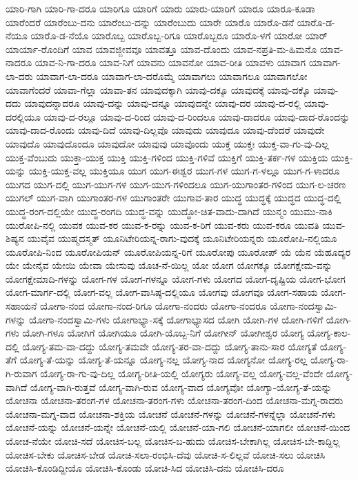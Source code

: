 {ಯಾರಿ-ಗಾಗಿ
ಯಾರಿ-ಗಾ-ದರೂ
ಯಾರಿಗೂ
ಯಾರಿಗೆ
ಯಾರು
ಯಾರು-ಯಾರಿಗೆ
ಯಾರೂ
ಯಾರೂ-ಕೂಡಾ
ಯಾರೆಂದರೆ
ಯಾರೆಂಬು-ದನು
ಯಾರೆಂಬು-ದನ್ನು
ಯಾರೆಂಬುದು
ಯಾರೇ
ಯಾರೊ
ಯಾರೊ-ಡನೆ
ಯಾರೊ-ಡ-ನೆಯೂ
ಯಾರೊ-ಡ-ನೆಯೊ
ಯಾರೊಬ್ಬ
ಯಾರೊಬ್ಬ-ರಿಗೂ
ಯಾರೊಬ್ಬರೂ
ಯಾರೊ-ಳಗೆ
ಯಾರೋ
ಯಾರ್
ಯಾರ್ಯಾ-ರೊಂದಿಗೆ
ಯಾವ
ಯಾವಜ್ಜೀವವೂ
ಯಾವತ್ತೂ
ಯಾವ-ದೊಂದು
ಯಾವ-ನಪ್ರತಿ-ಮ-ಹಿಮನೊ
ಯಾವ-ನಾದರೂ
ಯಾವ-ನಿ-ಗಾ-ದರೂ
ಯಾವ-ನಿಗೆ
ಯಾವನು
ಯಾವನೋ
ಯಾವ-ರೀತಿ
ಯಾವಳು
ಯಾವಾಗ
ಯಾವಾಗ-ಲಾ-ದರು
ಯಾವಾಗ-ಲಾ-ದರೂ
ಯಾವಾಗ-ಲಾ-ದರೊಮ್ಮೆ
ಯಾವಾಗಲು
ಯಾವಾಗಲೂ
ಯಾವಾಗಲೋ
ಯಾವಾಗೆಂದರೆ
ಯಾವಾ-ಗೆಲ್ಲಾ
ಯಾವಾ-ತನ
ಯಾವುದಕ್ಕಾಗಿ
ಯಾವು-ದಕ್ಕೂ
ಯಾವುದಕ್ಕೆ
ಯಾವು-ದಕ್ಕೊ
ಯಾವು-ದದು
ಯಾವುದನ್ನಾದರೂ
ಯಾವು-ದನ್ನು
ಯಾವು-ದನ್ನೂ
ಯಾವುದನ್ನೇ
ಯಾವು-ದರ
ಯಾವು-ದ-ರಲ್ಲಿ
ಯಾವು-ದರಲ್ಲಿಯೂ
ಯಾವು-ದ-ರಲ್ಲೂ
ಯಾವು-ದ-ರಿಂದ
ಯಾವು-ದ-ರಿಂದಲೂ
ಯಾವು-ದಾದರೂ
ಯಾವು-ದಾದ-ರೊಂದನ್ನು
ಯಾವು-ದಾದ-ರೊಂದು
ಯಾವು-ದಿದೆ
ಯಾವು-ದಿಲ್ಲವೊ
ಯಾವುದು
ಯಾವುದೂ
ಯಾವು-ದೆಂದರೆ
ಯಾವುದೇ
ಯಾವುದೊ
ಯಾವುದೊಂದೂ
ಯಾವುದೋ
ಯಾವುವು
ಯಾವೊಂದು
ಯುಕ್ತ
ಯುಕ್ತಃ
ಯುಕ್ತ-ವಾ-ಗು-ವು-ದಿಲ್ಲ
ಯುಕ್ತ-ವೆಂಬುದು
ಯುಕ್ತಾ-ಯುಕ್ತ
ಯುಕ್ತಿ
ಯುಕ್ತಿ-ಗಳಿಂದ
ಯುಕ್ತಿ-ಗಳಿವೆ
ಯುಕ್ತಿಗೆ
ಯುಕ್ತಿ-ತರ್ಕ-ಗಳ
ಯುಕ್ತಿಯ
ಯುಕ್ತಿ-ಯನ್ನು
ಯುಕ್ತಿ-ಯುಕ್ತ-ವಲ್ಲ
ಯುಕ್ತಿಯೂ
ಯುಗ
ಯುಗ-ಈಶ್ವರ
ಯುಗ-ಗಳ
ಯುಗ-ಗ-ಳಲ್ಲೂ
ಯುಗ-ಗ-ಳಾದರೂ
ಯುಗದ
ಯುಗ-ದಲ್ಲಿ
ಯುಗ-ಯುಗ-ಗಳ
ಯುಗ-ಯುಗ-ಗಳಿಂದಲೂ
ಯುಗ-ಯುಗಾಂತರ-ಗಳಿಂದ
ಯುಗ-ಲ-ಚರಣ
ಯುಗಲ್
ಯುಗ-ವಾಗಿ
ಯುಗಾಂತರ-ಗಳ
ಯುಗಾಂತರೇ
ಯುಗಾವ-ತಾರ
ಯುದ್ಧ
ಯುದ್ಧಕ್ಕೆ
ಯುದ್ಧದ
ಯುದ್ಧ-ದಲ್ಲಿ
ಯುದ್ಧ-ರಂಗ-ದಲ್ಲಿಯೇ
ಯುದ್ಧ-ರಂಗದಿ
ಯುದ್ಧ-ವನ್ನು
ಯುದ್ಧೋ-ಚಿತ-ವಾದು-ದಾಗಿದೆ
ಯುನ್ಮಂ
ಯುಮು-ನಾಕಿ
ಯುರೋಪಿ-ನಲ್ಲಿ
ಯುವಕ
ಯುವ-ಕರ
ಯುವ-ಕ-ರನ್ನು
ಯುವ-ಕ-ರಿಗೆ
ಯುವ-ಕರು
ಯುವ-ಕರೂ
ಯುವತಿ
ಯುವ-ಶಿಷ್ಯನ
ಯುವೈವ
ಯುಷ್ಮದಸ್ಮತ್
ಯೂನಿಟೇರಿಯನ್ನ-ರಾಗು-ವುದಕ್ಕೆ
ಯೂನಿಟೇರಿಯನ್ನರು
ಯೂರೋಪಿ-ನಲ್ಲಿಯೂ
ಯೂರೋಪಿ-ನಿಂದ
ಯೂರೋಪಿಯನ್
ಯೂರೋಪಿಯನ್ನ-ರಿಗೆ
ಯೂರೋಪು
ಯೂರೋಪ್
ಯೆ
ಯೆನ
ಯೆಹೂದ್ಯರ
ಯೇ
ಯೇನೈವ
ಯೇಯಿ
ಯೇವಾ
ಯೇಸುವು
ಯೊಚ-ನೆ-ಯಿಲ್ಲ
ಯೋ
ಯೋಗ
ಯೋಗಕ್ಕೂ
ಯೋಗಕ್ಷೇಮ-ವನ್ನು
ಯೋಗಕ್ಷೇಮಾದಿ-ಗಳನ್ನು
ಯೋಗ-ಗಳ
ಯೋಗ-ಗಳನ್ನೂ
ಯೋಗ-ಗಳು
ಯೋಗದ
ಯೋಗ-ದೃಷ್ಟಿಯ
ಯೋಗ-ಭೋಗ
ಯೋಗ-ಮಾರ್ಗ-ದಲ್ಲಿ
ಯೋಗ-ವಲ್ಲ
ಯೋಗ-ವಾಸಿಷ್ಠ-ದಲ್ಲಿಯೂ
ಯೋಗವು
ಯೋಗವೂ
ಯೋಗ-ಸಹಾಯ
ಯೋಗ-ಸಹಾಯನೆ
ಯೋಗಾ-ನಂದ
ಯೋಗಾ-ನಂದ-ರಿಗೂ
ಯೋಗಾ-ನಂದರು
ಯೋಗಾ-ನಂದರೂ
ಯೋಗಾ-ನಂದಸ್ವಾಮಿ-ಗಳನ್ನು
ಯೋಗಾ-ನಂದಸ್ವಾಮಿ-ಗಳು
ಯೋಗಾಭ್ಯಾ-ಸಕ್ಕೆ
ಯೋಗಾಭ್ಯಾಸದ
ಯೋಗಿ
ಯೋಗಿ-ಗಳ
ಯೋಗಿ-ಗಳಿಗೆ
ಯೋಗಿ-ಗಳು
ಯೋಗಿ-ಗಳೂ
ಯೋಗಿಗೆ
ಯೋಗಿಯೂ
ಯೋಗಿ-ಯೊಬ್ಬ-ನಿಗೆ
ಯೋಗೀನ್
ಯೋಗೀಶ್ವರ
ಯೋಗ್ಯ
ಯೋಗ್ಯ-ಕಾಲ-ದಲ್ಲಿ
ಯೋಗ್ಯ-ತಮ-ವಾ-ದದ್ದು
ಯೋಗ್ಯ-ತಮವೇ
ಯೋಗ್ಯ-ತರ-ವಾ-ದದ್ದು
ಯೋಗ್ಯ-ತಾನು-ಸಾರ
ಯೋಗ್ಯತೆ
ಯೋಗ್ಯ-ತೆಗೆ
ಯೋಗ್ಯ-ತೆ-ಯನ್ನು
ಯೋಗ್ಯ-ತೆ-ಯನ್ನೂ
ಯೋಗ್ಯ-ನಲ್ಲ
ಯೋಗ್ಯ-ನಾದ
ಯೋಗ್ಯನೋ
ಯೋಗ್ಯ-ರಲ್ಲ
ಯೋಗ್ಯ-ರಾ-ಗಿ-ರುವಾಗ
ಯೋಗ್ಯ-ರಾ-ಗು-ವು-ದಿಲ್ಲ
ಯೋಗ್ಯ-ರೀತಿ-ಯಲ್ಲಿ
ಯೋಗ್ಯರು
ಯೋಗ್ಯ-ವಲ್ಲ
ಯೋಗ್ಯ-ವಲ್ಲ-ವೆಂದೇ
ಯೋಗ್ಯ-ವಾಗಿದೆ
ಯೋಗ್ಯ-ವಾಗಿ-ರುತ್ತವೆ
ಯೋಗ್ಯ-ವಾಗಿ-ರುವ
ಯೋಗ್ಯ-ವಾದ
ಯೋಗ್ಯವೋ
ಯೋಗ್ಯಾ-ಯೋಗ್ಯ-ತೆ-ಯನ್ನು
ಯೋಚನಾ
ಯೋಚನಾ-ತರಂಗ-ಗಳ
ಯೋಚನಾ-ತರಂಗ-ಗಳು
ಯೋಚನಾ-ತರಂಗ-ದಿಂದ
ಯೋಚನಾ-ಮಗ್ನ-ರಾದರು
ಯೋಚನಾ-ಮಗ್ನ-ವಾದ
ಯೋಚನಾ-ಶಕ್ತಿಯ
ಯೋಚನೆ
ಯೋಚನೆ-ಗಳನ್ನು
ಯೋಚನೆ-ಗಳನ್ನೆಲ್ಲಾ
ಯೋಚನೆ-ಗಳು
ಯೋಚನೆ-ಯನ್ನು
ಯೋಚನೆ-ಯನ್ನೇ
ಯೋಚನೆ-ಯಲ್ಲಿ
ಯೋಚನೆ-ಯಾ-ಗಲಿ
ಯೋಚನೆ-ಯಾಗಲೀ
ಯೋಚನೆ-ಯಿಂದ
ಯೋಚ-ನೆಯೇ
ಯೋಚಿ-ಸದೆ
ಯೋಚಿಸ-ಬಲ್ಲ
ಯೋಚಿಸ-ಬ-ಹುದು
ಯೋಚಿಸ-ಬೇಕಾಗಿಲ್ಲ
ಯೋಚಿಸ-ಬೇ-ಕಾದ್ದಿಲ್ಲ
ಯೋಚಿಸ-ಬೇಕು
ಯೋಚಿಸ-ಬೇಡ
ಯೋಚಿ-ಸಲಾ-ರಂಭಿಸಿ-ದೆವು
ಯೋಚಿ-ಸ-ಲಿಲ್ಲವೆ
ಯೋಚಿ-ಸಲು
ಯೋಚಿಸಿ
ಯೋಚಿಸಿ-ಕೊಂಡಿದ್ದೀಯೊ
ಯೋಚಿಸಿ-ಕೊಂಡು
ಯೋಚಿ-ಸಿದ
ಯೋಚಿಸಿ-ದನು
ಯೋಚಿಸಿ-ದರೂ
}
